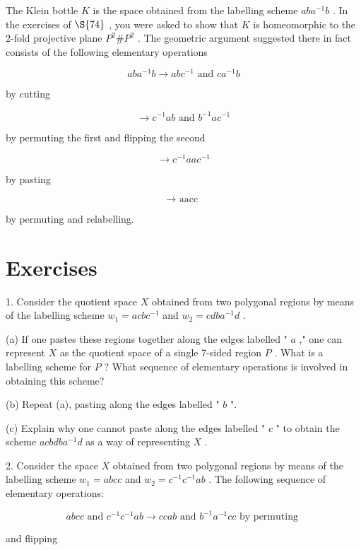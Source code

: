 \begin{theorem}
\begin{example} The Klein bottle \(K\) is the space obtained from the labelling scheme \({ab}{a}^{-1}b\) . In the exercises of \( \S {74}\) , you were asked to show that \(K\) is homeomorphic to the 2-fold projective plane \({P}^{2}\# {P}^{2}\) . The geometric argument suggested there in fact consists of the following elementary operations

\[
{ab}{a}^{-1}b \rightarrow  {ab}{c}^{-1}\text{ and }c{a}^{-1}b
\]

by cutting

\[
\rightarrow  {c}^{-1}{ab}\text{ and }{b}^{-1}a{c}^{-1}
\]

by permuting the first and flipping the second

\[
\rightarrow  {c}^{-1}{aa}{c}^{-1}
\]

by pasting

\[
\rightarrow  \text{ aacc }
\]

by permuting and relabelling.
\end{example}

\section*{Exercises}

1. Consider the quotient space \(X\) obtained from two polygonal regions by means of the labelling scheme \({w}_{1} = {acb}{c}^{-1}\) and \({w}_{2} = {cdb}{a}^{-1}d\) .

(a) If one pastes these regions together along the edges labelled " \(a\) ," one can represent \(X\) as the quotient space of a single 7-sided region \(P\) . What is a labelling scheme for \(P\) ? What sequence of elementary operations is involved in obtaining this scheme?

(b) Repeat (a), pasting along the edges labelled " \(b\) ".

(c) Explain why one cannot paste along the edges labelled " \(c\) " to obtain the scheme \({acbdb}{a}^{-1}d\) as a way of representing \(X\) .

2. Consider the space \(X\) obtained from two polygonal regions by means of the labelling scheme \({w}_{1} = {abcc}\) and \({w}_{2} = {c}^{-1}{c}^{-1}{ab}\) . The following sequence of elementary operations:

\[
{abcc}\text{ and }{c}^{-1}{c}^{-1}{ab} \rightarrow  {ccab}\text{ and }{b}^{-1}{a}^{-1}{cc}\text{ by permuting }
\]

and flipping


\end{theorem}
